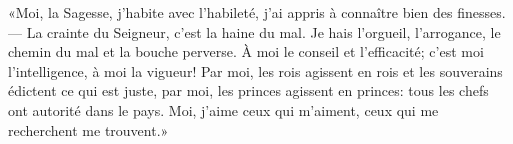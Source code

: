 «Moi, la Sagesse, j’habite avec l’habileté,
	j’ai appris à connaître bien des finesses.
--- La crainte du Seigneur, c’est la haine du mal.
	Je hais l’orgueil, l’arrogance, le chemin du mal et la bouche perverse.
À moi le conseil et l’efficacité;
	c’est moi l’intelligence, à moi la vigueur!
Par moi, les rois agissent en rois et les souverains édictent ce qui est juste,
	par moi, les princes agissent en princes:
	tous les chefs ont autorité dans le pays.
Moi, j’aime ceux qui m’aiment, ceux qui me recherchent me trouvent.»
